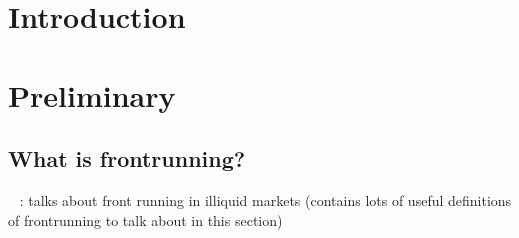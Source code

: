 
\section{Introduction}




\section{Preliminary}

\subsection{What is frontrunning?} %





~\cite{liang2005distressed} : talks about front running in illiquid markets (contains lots of useful definitions of frontrunning to talk about in this section)












